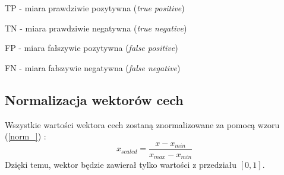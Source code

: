 \documentclass{classrep}
\begin{document}
TP - miara prawdziwie pozytywna (\textsl{true positive})

TN - miara prawdziwie negatywna (\textsl{true negative})

FP - miara fałszywie pozytywna (\textsl{false positive})

FN - miara fałszywie negatywna (\textsl{false negative})

\subsection{Normalizacja wektorów cech}
Wszystkie wartości wektora cech zostaną znormalizowane za pomocą wzoru (\ref{norm_}) \cite{norm}:
\begin{equation} \label{norm_} x_{scaled} = \frac{x - x_{min}}{x_{max} - x_{min}}  \end{equation}
Dzięki temu, wektor będzie zawierał tylko wartości z przedziału $[0,1]$.
\end{document}
